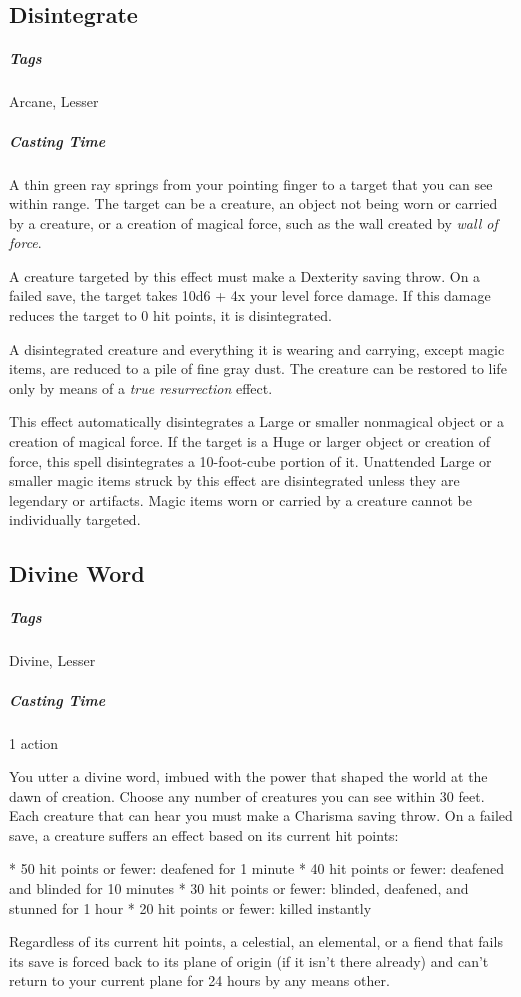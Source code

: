 \subsection{Disintegrate\label{spell:disintegrate}}
\subparagraph*{Tags} Arcane, Lesser
\subparagraph*{Casting Time}

A thin green ray springs from your pointing finger to a target that you can see within range. The target can be a creature, an object not being worn or carried by a creature, or a creation of magical force, such as the wall created by \textit{wall of force}.

A creature targeted by this effect must make a Dexterity saving throw. On a failed save, the target takes 10d6 + 4x your level force damage. If this damage reduces the target to 0 hit points, it is disintegrated.

A disintegrated creature and everything it is wearing and carrying, except magic items, are reduced to a pile of fine gray dust. The creature can be restored to life only by means of a \textit{true resurrection} effect.

This effect automatically disintegrates a Large or smaller nonmagical object or a creation of magical force. If the target is a Huge or larger object or creation of force, this spell disintegrates a 10-foot-cube portion of it. Unattended Large or smaller magic items struck by this effect are disintegrated unless they are legendary or artifacts. Magic items worn or carried by a creature cannot be individually targeted.

\subsection{Divine Word\label{spell:divine-word}}
\subparagraph*{Tags} Divine, Lesser
\subparagraph*{Casting Time} 1 action

You utter a divine word, imbued with the power that shaped the world at the dawn of creation. Choose any number of creatures you can see within 30 feet. Each creature that can hear you must make a Charisma saving throw. On a failed save, a creature suffers an effect based on its current hit points:

* 50 hit points or fewer: deafened for 1 minute
* 40 hit points or fewer: deafened and blinded for 10 minutes
* 30 hit points or fewer: blinded, deafened, and stunned for 1 hour
* 20 hit points or fewer: killed instantly 

Regardless of its current hit points, a celestial, an elemental, or a fiend that fails its save is forced back to its plane of origin (if it isn’t there already) and can’t return to your current plane for 24 hours by any means other.

